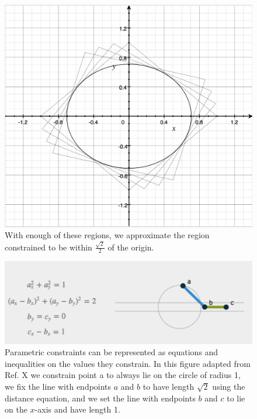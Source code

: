 \begin{figure} 
\includegraphics[scale=0.4]{dist3.png}
\caption{With enough of these regions, we approximate the region constrained to be within $\frac{\sqrt{2}}{2}$ of the origin.}
\label{dist3}
\end{figure}


\begin{figure}[h]
  \includegraphics[width=\linewidth]{constraints.jpg}
  \caption{Parametric constraints can be represented as equations and inequalities on the values they constrain. In this figure adapted from Ref. X we constrain point a to always lie on the circle of radius 1, we fix the line with endpoints $a$ and $b$ to have length $\sqrt{2}$ using the distance equation, and we set the line with endpoints $b$ and $c$ to lie on the $x$-axis and have length 1.}
  \label{fig:constraints}
\end{figure}


